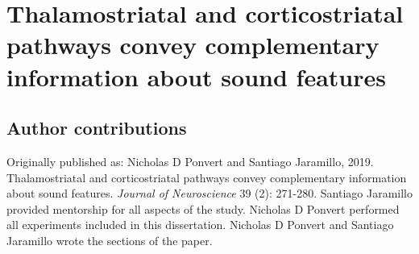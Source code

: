\newcommand{\Anatomy}{1}
\newcommand{\AnatomyInjection}{\Anatomy A}
\newcommand{\AnatomyThalExample}{\Anatomy B}
\newcommand{\AnatomyThalSummary}{\Anatomy C}
\newcommand{\AnatomyThalamus}{\Anatomy B, C}
\newcommand{\AnatomyACExample}{\Anatomy D}
\newcommand{\AnatomyACSummary}{\Anatomy E}
\newcommand{\AnatomyAC}{\Anatomy D, E}

\newcommand{\Method}{2}
\newcommand{\MethodDiagram}{\Method A}
\newcommand{\MethodDirectCell}{\Method B}
\newcommand{\MethodDirectCellAndNBQXPop}{\Method B, F}
\newcommand{\MethodIndirectNoFollow}{\Method C}
\newcommand{\MethodLongLatency}{\Method C, D}
\newcommand{\MethodIndirectFollows}{\Method D}
\newcommand{\MethodSoundCharPop}{\Method E}

\newcommand{\NoiseLaser}{3}
\newcommand{\NoiseLaserThalDiagram}{\NoiseLaser A}
\newcommand{\NoiseLaserThalExample}{\NoiseLaser B}
\newcommand{\NoiseLaserThalLocations}{\NoiseLaser C}
\newcommand{\NoiseLaserACDiagram}{\NoiseLaser D}
\newcommand{\NoiseLaserACExample}{\NoiseLaser E}
\newcommand{\NoiseLaserACLocations}{\NoiseLaser F}
\newcommand{\NoiseLaserDiagrams}{\NoiseLaser A, D}

\newcommand{\Frequency}{4}
\newcommand{\FrequencyThalExample}{\Frequency A}
\newcommand{\FrequencyACExample}{\Frequency B}
\newcommand{\FrequencyBW}{\Frequency C}
\newcommand{\FrequencyThreshold}{\Frequency D}
\newcommand{\FrequencyLatency}{\Frequency E}
\newcommand{\FrequencyOnsetivity}{\Frequency F}
\newcommand{\FrequencyMonotonicity}{\Frequency G}

\newcommand{\AM}{5}
\newcommand{\AMThalExamples}{\AM A, B}
\newcommand{\AMACExamples}{\AM E, F}
\newcommand{\AMPies}{\AM C}
\newcommand{\AMSync}{\AM D}
\newcommand{\AMRateDiscrim}{\AM G}
\newcommand{\AMPhaseDiscrim}{\AM H}

\chapter{Thalamostriatal and corticostriatal pathways convey complementary information about sound features}

\section{Author contributions}
\noindent Originally published as: Nicholas D Ponvert and Santiago Jaramillo, 2019. Thalamostriatal and corticostriatal pathways convey complementary information about sound features. \textit{Journal of Neuroscience} 39 (2): 271-280. 
%
Santiago Jaramillo provided mentorship for all aspects of the study. Nicholas D Ponvert performed all experiments included in this dissertation. Nicholas D Ponvert and Santiago Jaramillo wrote the sections of the paper. 


